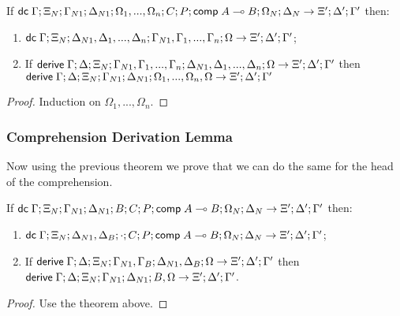 \begin{theorem}
   If $\mathsf{dc} \; \Gamma; \Xi_N; \Gamma_{N1}; \Delta_{N1}; \Omega_1, ..., \Omega_n; C; P; \mathsf{comp} \; A \multimap B; \Omega_N; \Delta_N \rightarrow \Xi'; \Delta'; \Gamma'$ then:
   
   \begin{enumerate}
      \item $\mathsf{dc} \; \Gamma; \Xi_N; \Delta_{N1}, \Delta_1, ..., \Delta_n; \Gamma_{N1}, \Gamma_1, ..., \Gamma_n; \Omega \rightarrow \Xi'; \Delta'; \Gamma'$;
      \item If $\mathsf{derive} \; \Gamma; \Delta; \Xi_N; \Gamma_{N1}, \Gamma_1, ..., \Gamma_n; \Delta_{N1}, \Delta_1, ..., \Delta_n; \Omega \rightarrow \Xi'; \Delta'; \Gamma'$ then $\mathsf{derive} \; \Gamma; \Delta; \Xi_N; \Gamma_{N1}; \Delta_{N1}; \Omega_1, ..., \Omega_n, \Omega \rightarrow \Xi'; \Delta'; \Gamma'$
   \end{enumerate}
\end{theorem}

\begin{proof}
   Induction on $\Omega_1, ..., \Omega_n$.
\end{proof}

\subsubsection{Comprehension Derivation Lemma}

Now using the previous theorem we prove that we can do the same for the head of the comprehension.

\begin{theorem}
   If $\mathsf{dc} \; \Gamma; \Xi_N; \Gamma_{N1}; \Delta_{N1}; B; C; P; \mathsf{comp} \; A \multimap B; \Omega_N; \Delta_N \rightarrow \Xi'; \Delta'; \Gamma'$ then:
   
   \begin{enumerate}
      \item $\mathsf{dc} \; \Gamma; \Xi_N; \Delta_{N1}, \Delta_B; \cdot; C; P; \mathsf{comp} \; A \multimap B; \Omega_N; \Delta_N \rightarrow \Xi'; \Delta'; \Gamma'$;
      \item If $\mathsf{derive} \; \Gamma; \Delta; \Xi_N; \Gamma_{N1}, \Gamma_B; \Delta_{N1}, \Delta_B; \Omega \rightarrow \Xi'; \Delta'; \Gamma'$ then $\mathsf{derive} \; \Gamma; \Delta; \Xi_N; \Gamma_{N1}; \Delta_{N1}; B, \Omega \rightarrow \Xi'; \Delta'; \Gamma'$.
   \end{enumerate}
\end{theorem}

\begin{proof}
   Use the theorem above.
\end{proof}

